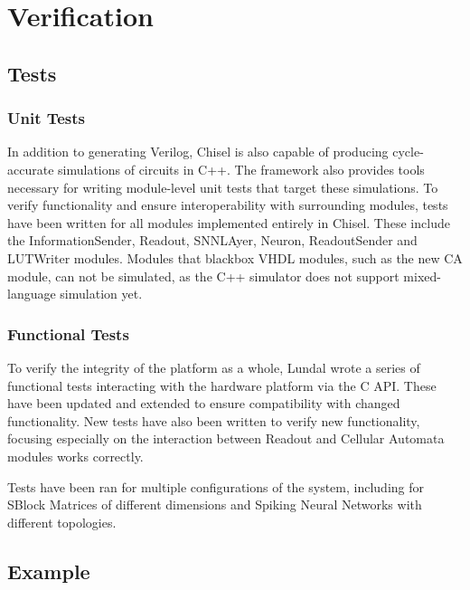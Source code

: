 
\chapter{Verification}



\section{Tests}

\subsection{Unit Tests}

In addition to generating Verilog, Chisel is also capable of producing
cycle-accurate simulations of circuits in C++. The framework also provides tools
necessary for writing module-level unit tests that target these simulations. To
verify functionality and ensure interoperability with surrounding modules, tests
have been written for all modules implemented entirely in Chisel. These include
the InformationSender, Readout, SNNLAyer, Neuron, ReadoutSender and LUTWriter
modules. Modules that blackbox VHDL modules, such as the new CA module, can not
be simulated, as the C++ simulator does not support mixed-language simulation yet.

\subsection{Functional Tests}

To verify the integrity of the platform as a whole, Lundal wrote a series of
functional tests interacting with the hardware platform via the C API. These
have been updated and extended to ensure compatibility with changed
functionality. New tests have also been written to verify new functionality,
focusing especially on the interaction between Readout and Cellular Automata
modules works correctly.

Tests have been ran for multiple configurations of the system, including
for SBlock Matrices of different dimensions and Spiking Neural Networks with
different topologies.

\section{Example}

